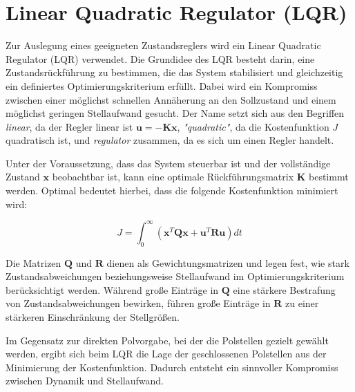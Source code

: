 \section{Linear Quadratic Regulator (LQR)}
\label{sec:lqr_regler}
Zur Auslegung eines geeigneten Zustandsreglers wird ein Linear Quadratic Regulator (LQR) verwendet. 
Die Grundidee des LQR besteht darin, eine Zustandsrückführung zu bestimmen, die das System stabilisiert und 
gleichzeitig ein definiertes Optimierungskriterium erfüllt. Dabei wird ein Kompromiss zwischen einer möglichst 
schnellen Annäherung an den Sollzustand und einem möglichst geringen Stellaufwand gesucht. Der Name setzt sich aus den Begriffen \textit{linear}, da der Regler linear ist $\mathbf{u} = -\mathbf{K} \mathbf{x}$, \textit{"quadratic"}, da die Kostenfunktion $J$ quadratisch ist, und \textit{regulator} zusammen, da es sich um einen Regler handelt.

Unter der Voraussetzung, dass das System steuerbar ist und der vollständige Zustand $\mathbf{x}$ beobachtbar ist, 
kann eine optimale Rückführungsmatrix $\mathbf{K}$ bestimmt werden. Optimal bedeutet hierbei, dass die folgende 
Kostenfunktion minimiert wird:

\begin{equation}
J = \int_{0}^{\infty} \left( \mathbf{x}^{T} \mathbf{Q} \mathbf{x} + \mathbf{u}^{T} \mathbf{R} \mathbf{u} \right) dt
\end{equation}

Die Matrizen $\mathbf{Q}$ und $\mathbf{R}$ dienen als Gewichtungsmatrizen und legen fest, wie stark 
Zustandsabweichungen beziehungsweise Stellaufwand im Optimierungskriterium berücksichtigt werden. 
Während große Einträge in $\mathbf{Q}$ eine stärkere Bestrafung von Zustandsabweichungen bewirken, 
führen große Einträge in $\mathbf{R}$ zu einer stärkeren Einschränkung der Stellgrößen.

Im Gegensatz zur direkten Polvorgabe, bei der die Polstellen gezielt gewählt werden, ergibt sich beim LQR 
die Lage der geschlossenen Polstellen aus der Minimierung der Kostenfunktion. Dadurch entsteht ein sinnvoller Kompromiss zwischen Dynamik und Stellaufwand.
\parencite{DataDrivenScience}

